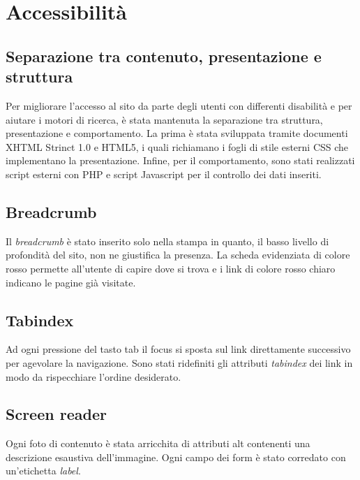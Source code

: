 \section{Accessibilità}
\subsection{Separazione tra contenuto, presentazione e struttura}
Per migliorare l'accesso al sito da parte degli utenti con differenti disabilità e per aiutare i motori di ricerca, è stata mantenuta la separazione tra struttura, presentazione e comportamento.
La prima è stata sviluppata tramite documenti XHTML Strinct 1.0 e HTML5, i quali richiamano i fogli di stile esterni CSS che implementano la presentazione.
Infine, per il comportamento, sono stati realizzati script esterni con PHP e script Javascript per il controllo dei dati inseriti.
\subsection{Breadcrumb}
Il \textit{breadcrumb} è stato inserito solo nella stampa in quanto, il basso livello di profondità del sito, non ne giustifica la presenza. La scheda evidenziata di colore rosso permette all'utente di capire dove si trova e i link di colore rosso chiaro indicano le pagine già visitate.
\subsection{Tabindex}
Ad ogni pressione del tasto tab il focus si sposta sul link direttamente successivo per agevolare la navigazione. Sono stati ridefiniti gli attributi \textit{tabindex} dei link in modo da rispecchiare l'ordine desiderato.
\subsection{Screen reader}
Ogni foto di contenuto è stata arricchita di attributi alt contenenti una descrizione esaustiva dell'immagine.
Ogni campo dei form è stato corredato con un'etichetta \textit{label}.
